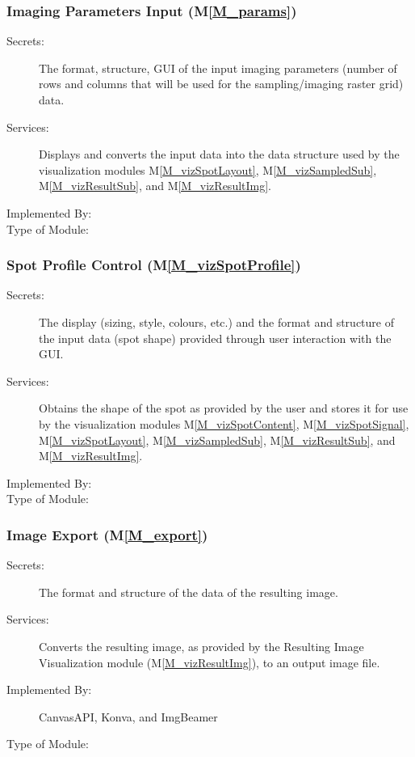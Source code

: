 \documentclass[12pt, titlepage]{article}
\newcommand{\mref}[1]{M\ref{#1}}
\begin{document}
\subsubsection{Imaging Parameters Input (\mref{M_params})}
\begin{description}
\item[Secrets:]The format, structure, GUI of the input imaging parameters (number
  of rows and columns that will be used for the sampling/imaging raster grid) data.
\item[Services:]Displays and converts the input data into the data structure used by the
  visualization modules \mref{M_vizSpotLayout}, \mref{M_vizSampledSub}, \mref{M_vizResultSub},
  and \mref{M_vizResultImg}.
\item[Implemented By:] \progname{}
\item[Type of Module:] 
\end{description}


\subsubsection{Spot Profile Control (\mref{M_vizSpotProfile})}
\begin{description}
\item[Secrets:]The display (sizing, style, colours, etc.) and
  the format and structure of the input data (spot shape) provided
  through user interaction with the GUI.
\item[Services:] Obtains the shape of the spot as provided by the user and stores it for use
  by the visualization modules \mref{M_vizSpotContent}, \mref{M_vizSpotSignal}, \mref{M_vizSpotLayout},
  \mref{M_vizSampledSub}, \mref{M_vizResultSub}, and \mref{M_vizResultImg}.
\item[Implemented By:] \progname{}
\item[Type of Module:] 
\end{description}


\subsubsection{Image Export (\mref{M_export})}
\begin{description}
\item[Secrets:]The format and structure of the data of the resulting image.
\item[Services:]Converts the resulting image, as provided by the 
  Resulting Image Visualization module (\mref{M_vizResultImg}), to an output image file.
\item[Implemented By:] CanvasAPI, Konva, and ImgBeamer
\item[Type of Module:] 
\end{description}
\end{document}
